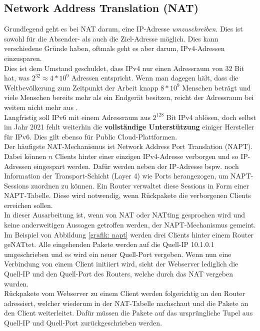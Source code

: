\subsection{Network Address Translation (NAT)}
Grundlegend geht es bei NAT darum, eine IP-Adresse \textit{umzuschreiben}. Dies ist sowohl für die Absender- als auch die Ziel-Adresse möglich. Dies kann verschiedene Gründe haben, oftmals geht es aber darum, IPv4-Adressen einzusparen.\\
Dies ist dem Umstand geschuldet, dass IPv4 nur einen Adressraum von 32 Bit hat, was $2^{32} \approx 4*10^9$ Adressen entspricht. Wenn man dagegen hält, dass die Weltbevölkerung zum Zeitpunkt der Arbeit knapp $8*10^9$ Menschen beträgt und viele Menschen bereits mehr als ein Endgerät besitzen, reicht der Adressraum bei weitem nicht mehr aus \cite{weltbevoelkerung2020dsw}.\\
Langfristig soll IPv6 mit einem Adressraum aus $2^{128}$ Bit IPv4 ablösen, doch selbst im Jahr 2021 fehlt weiterhin die \textbf{vollständige Unterstützung} einiger Hersteller für IPv6. Dies gilt ebenso für Public Cloud-Plattformen.\\
Der häufigste NAT-Mechanismus ist Network Address Port Translation (NAPT). Dabei können $n$ Clients hinter einer einzigen IPv4-Adresse \glqq verborgen\grqq{} und so IP-Adressen eingespart werden. Dafür werden neben der IP-Adresse bspw. noch Information der Transport-Schicht (Layer 4) wie Ports herangezogen, um NAPT-Sessions zuordnen zu können. Ein Router verwaltet diese Sessions in Form einer NAPT-Tabelle. Diese wird notwendig, wenn Rückpakete die verborgenen Clients erreichen sollen.\\
In dieser Ausarbeitung ist, wenn von NAT oder NATting gesprochen wird und keine anderweitigen Aussagen getroffen werden, der NAPT-Mechanismus gemeint.\\
Im Beispiel von Abbildung \ref{grafik: napt} werden drei Clients hinter einem Router geNATtet. Alle eingehenden Pakete werden auf die Quell-IP 10.1.0.1 umgeschrieben und es wird ein neuer Quell-Port vergeben. Wenn nun eine Verbindung von einem Client initiiert wird, sieht der Webserver lediglich die Quell-IP und den Quell-Port des Routers, welche durch das NAT vergeben wurden.\\
Rückpakete vom Webserver zu einem Client werden folgerichtig an den Router adressiert, welcher wiederum in der NAT-Tabelle nachschaut und die Pakete an den Client weiterleitet. Dafür müssen die Pakete auf das ursprüngliche Tupel aus Quell-IP und Quell-Port zurückgeschrieben werden.\\

